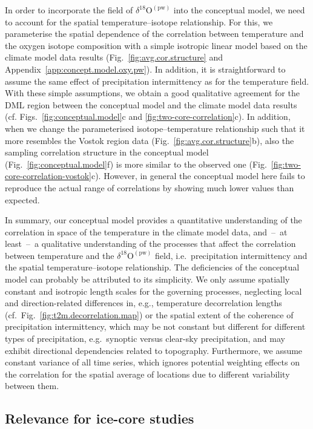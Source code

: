 \documentclass[cp, manuscript]{copernicus}
\begin{document}
In order to incorporate the field of $\delta^{18}\mathrm{O}^{\mathrm{(pw)}}$
into the conceptual model, we need to account for the spatial
temperature--isotope relationship. For this, we parameterise the spatial
dependence of the correlation between temperature and the oxygen isotope
composition with a simple isotropic linear model based on the climate model data
results (Fig.~\ref{fig:avg.cor.structure} and
Appendix~\ref{app:concept.model.oxy.pw}). In addition, it is straightforward to
assume the same effect of precipitation intermittency as for the temperature
field. With these simple assumptions, we obtain a good qualitative agreement for
the DML region between the conceptual model and the climate model data results
(cf. Figs.~\ref{fig:conceptual.model}c and \ref{fig:two-core-correlation}c). In
addition, when we change the parameterised isotope--temperature relationship
such that it more resembles the Vostok region data
(Fig.~\ref{fig:avg.cor.structure}b), also the sampling correlation structure in
the conceptual model (Fig.~\ref{fig:conceptual.model}f) is more similar to the
observed one (Fig.~\ref{fig:two-core-correlation-vostok}c). However, in general
the conceptual model here fails to reproduce the actual range of correlations by
showing much lower values than expected.

In summary, our conceptual model provides a quantitative understanding of the
correlation in space of the temperature in the climate model data, and~--~at
least~--~a qualitative understanding of the processes that affect the
correlation between temperature and the $\delta^{18}\mathrm{O}^{\mathrm{(pw)}}$
field, i.e.\ precipitation intermittency and the spatial temperature--isotope
relationship. The deficiencies of the conceptual model can probably be
attributed to its simplicity. We only assume spatially constant and isotropic
length scales for the governing processes, neglecting local and
direction-related differences in, e.g., temperature decorrelation lengths
(cf.~Fig.~\ref{fig:t2m.decorrelation.map}) or the spatial extent of the
coherence of precipitation intermittency, which may be not constant but
different for different types of precipitation, e.g.\ synoptic versus clear-sky
precipitation, and may exhibit directional dependencies related to
topography. Furthermore, we assume constant variance of all time series, which
ignores potential weighting effects on the correlation for the spatial average
of locations due to different variability between them.

\subsection{Relevance for ice-core studies}
\label{discussion:relevance}
\end{document}
